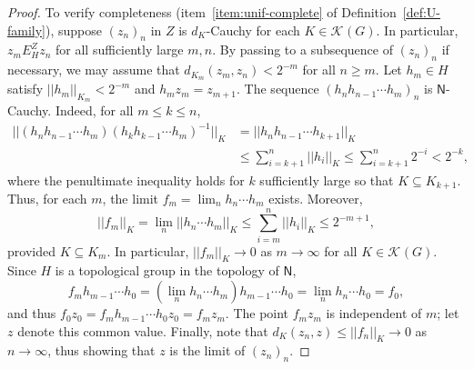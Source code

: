 \documentclass[12pt]{paper}
\numberwithin{equation}{section}
\theoremstyle{plain}
\theoremstyle{definition}
\newcommand{\vietoris}[2][]{\mathcal{K}_{#1}(#2)}
\newcommand{\unifn}{\mathsf{N}}
\newcommand{\norm}[1]{||#1||}
\begin{document}
\begin{proof}
  To verify completeness (item~\eqref{item:unif-complete} of Definition~\ref{def:U-family}), suppose
  \((z_{n})_{n}\) in \(Z\) is \(d_{K}\)-Cauchy for each \(K \in \vietoris{G}\).  In particular,
  \(z_{m} E^{Z}_{H} z_{n}\) for all sufficiently large \(m, n\).  By passing to a subsequence of
  \((z_{n})_{n}\) if necessary, we may assume that \(d_{K_{m}}(z_{m}, z_{n}) < 2^{-m}\) for all
  \(n \ge m\).  Let \(h_{m} \in H\) satisfy \(\norm{h_{m}}_{K_{m}} < 2^{-m}\) and
  \(h_{m}z_{m} = z_{m+1}\).  The sequence \((h_{n}h_{n-1}\cdots h_{m})_{n}\) is \(\unifn\)-Cauchy.
  Indeed, for all \(m \le k \le n\),
  \begin{displaymath}
    \begin{aligned}
      \norm{(h_{n}h_{n-1}\cdots h_{m}) (h_{k}h_{k-1}\cdots h_{m})^{-1}}_{K}
      &= \norm{h_{n}h_{n-1} \cdots h_{k+1}}_{K} \\
      &\le \sum_{i = k+1}^{n} \norm{h_{i}}_{K} \le \sum_{i=k+1}^{n} 2^{-i} < 2^{-k},
    \end{aligned}
  \end{displaymath}
  where the penultimate inequality holds for \(k\) sufficiently large so that
  \(K \subseteq K_{k+1}\).  Thus, for each \(m\), the limit \(f_{m} = \lim_{n}h_{n}\cdots h_{m}\)
  exists.  Moreover,
  \[\norm{f_{m}}_{K} = \lim_{n}\norm{h_{n} \cdots h_{m}}_{K} \le \sum_{i=m}^{n}\norm{h_{i}}_{K} \le
    2^{-m+1},\]
  provided \(K \subseteq K_{m}\).  In particular, \(\norm{f_{m}}_{K} \to 0\) as \(m \to \infty\) for
  all \(K \in \vietoris{G}\).  Since \(H\) is a topological group in the topology of \(\unifn\),
  \[f_{m}h_{m-1} \cdots h_{0} = (\lim_{n}h_{n} \cdots h_{m})h_{m-1} \cdots h_{0} = \lim_{n}h_{n}
    \cdots h_{0} = f_{0},\]
  and thus \(f_{0}z_{0} = f_{m}h_{m-1}\cdots h_{0}z_{0} = f_{m}z_{m}\).
  The point \(f_{m}z_{m}\) is
  independent of \(m\); let \(z\) denote this common value.  Finally, note that
  \(d_{K}(z_{n},z) \le \norm{f_{n}}_{K} \to 0\) as \(n \to \infty\), thus showing that \(z\) is the
  limit of \((z_{n})_{n}\).


\end{proof}
\end{document}
